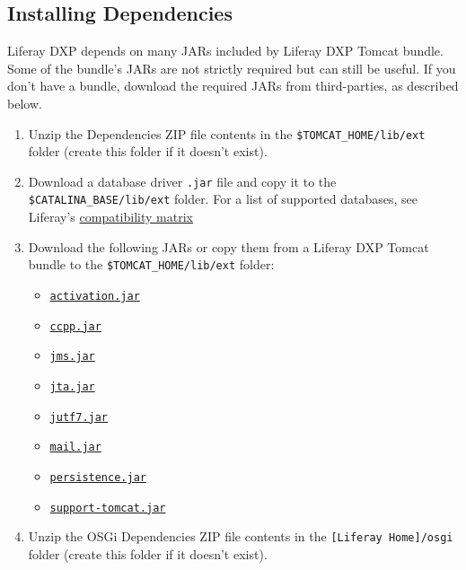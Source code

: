 \subsection{Installing Dependencies}\label{installing-dependencies}

Liferay DXP depends on many JARs included by Liferay DXP Tomcat bundle.
Some of the bundle's JARs are not strictly required but can still be
useful. If you don't have a bundle, download the required JARs from
third-parties, as described below.

\begin{enumerate}
\def\labelenumi{\arabic{enumi}.}
\item
  Unzip the Dependencies ZIP file contents in the
  \texttt{\$TOMCAT\_HOME/lib/ext} folder (create this folder if it
  doesn't exist).
\item
  Download a database driver \texttt{.jar} file and copy it to the
  \texttt{\$CATALINA\_BASE/lib/ext} folder. For a list of supported
  databases, see Liferay's
  \href{https://web.liferay.com/documents/14/21598941/Liferay+DXP+7.1+Compatibility+Matrix/9f9c917a-c620-427b-865d-5c4b4a00be85}{compatibility
  matrix}
\item
  Download the following JARs or copy them from a Liferay DXP Tomcat
  bundle to the \texttt{\$TOMCAT\_HOME/lib/ext} folder:

  \begin{itemize}
  \tightlist
  \item
    \href{http://www.oracle.com/technetwork/java/javase/jaf-136260.html}{\texttt{activation.jar}}
  \item
    \href{http://mvnrepository.com/artifact/javax.ccpp/ccpp/1.0}{\texttt{ccpp.jar}}
  \item
    \href{http://www.oracle.com/technetwork/java/docs-136352.html}{\texttt{jms.jar}}
  \item
    \href{http://www.oracle.com/technetwork/java/javaee/jta/index.html}{\texttt{jta.jar}}
  \item
    \href{http://mvnrepository.com/artifact/com.beetstra.jutf7/jutf7}{\texttt{jutf7.jar}}
  \item
    \href{http://www.oracle.com/technetwork/java/index-138643.html}{\texttt{mail.jar}}
  \item
    \href{http://mvnrepository.com/artifact/org.eclipse.persistence/javax.persistence/2.1.1}{\texttt{persistence.jar}}
  \item
    \href{http://mvnrepository.com/artifact/com.liferay.portal/com.liferay.support.tomcat}{\texttt{support-tomcat.jar}}
  \end{itemize}
\item
  Unzip the OSGi Dependencies ZIP file contents in the
  \texttt{{[}Liferay\ Home{]}/osgi} folder (create this folder if it
  doesn't exist).
\end{enumerate}

